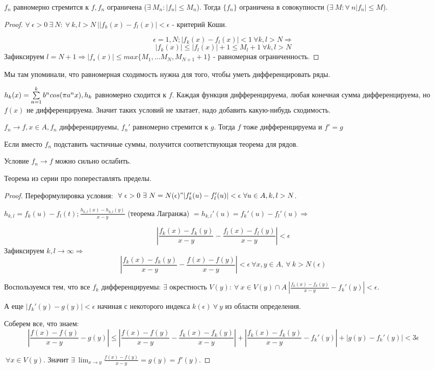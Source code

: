 \documentclass[12pt]{report}
\begin{document}
\begin{st}
$f_n$ равномерно стремится к $f, f_n$ ограничена ($\exists ~M_n: |f_n| \le M_n$). Тогда $\{f_n\}$ ограничена в совокупности ($\exists ~M: \forall ~n |f_n| \le M$).
\end{st}
\begin{proof}
$\forall ~\epsilon > 0 ~\exists ~N: ~\forall ~k, l > N ~||f_k(x) - f_l(x)| < \epsilon$ - критерий Коши.

$$\epsilon = 1, N; |f_k(x) - f_l(x)| < 1 ~\forall k, l > N \Rightarrow$$
$$|f_k(x)| \le |f_l(x)| + 1 \le M_l + 1 ~\forall k, l > N$$
Зафиксируем $l = N + 1 \Rightarrow |f_s(x)| \le max\{M_1, \dots M_N, M_{N + 1} + 1\}$ - равномерная ограниченность.
\end{proof}

Мы там упоминали, что равномерная сходимость нужна для того, чтобы уметь дифференцировать ряды.

$h_k(x) = \sum\limits_{n = 1}^k{b^n cos(\pi a^n x)}, h_k$ равномерно сходится к $f$. Каждая функция дифференцируема, любая конечная сумма дифференцируема, но $f(x)$ не дифференцируема. Значит таких условий не хватает, надо добавить какую-нибудь сходимость.

\begin{thm}
$f_n \to f, x \in A, f_n$ дифференцируемы, $f_n'$ равномерно стремится к $g$. Тогда $f$ тоже дифференцируема и $f' = g$

Если вместо $f_n$ подставить частичные суммы, получится соответствующая теорема для рядов.

Условие $f_n \to f$ можно сильно ослабить.

Теорема из серии про попереставлять пределы.
\end{thm}
\begin{proof}
Переформулировка условия: $~\forall ~\epsilon > 0 ~\exists ~N = N(\epsilon)" |f_k'(u) - f_l'(u)| < \epsilon ~\forall u \in A, k, l > N$.

$h_{k, l} = f_k(u) - f_l(t); \frac{h_{k, l}(x) - h_{k, l}(y)}{x - y}$ (теорема Лагранжа) $ = h_{k, l}'(u) = f_k'(u) - f_l'(u) \Rightarrow$

$$\left|\frac{f_k(x) - f_k(y)}{x - y} - \frac{f_l(x) - f_l(y)}{x - y}\right| < \epsilon$$
Зафиксируем $k, l \to \infty \Rightarrow$
$$\left|\frac{f_k(x) - f_k(y)}{x - y} - \frac{f(x) - f(y)}{x - y}\right| < \epsilon ~\forall x, y \in A, ~\forall ~k > N(\epsilon)$$

Воспользуемся тем, что все $f_k$ дифференцируемы: $\exists$ окрестность $V(y): ~\forall ~x \in V(y) \cap A ~\left|\frac{f_k(x) - f_k(y)}{x - y} - f_k'(y)\right| < \epsilon$.

А еще $|f_k'(y) - g(y)| < \epsilon$ начиная с некоторого индекса $k(\epsilon) ~\forall ~y$ из области определения.

Соберем все, что знаем:
$$\left|\frac{f(x) - f(y)}{x - y} - g(y)\right| \le \left|\frac{f(x) - f(y)}{x - y} - \frac{f_k(x) - f_k(y)}{x - y}\right| + \left|\frac{f_k(x) - f_k(y)}{x - y} - f_k'(y)\right| + |g(y) - f_k'(y)| < 3\epsilon$$ 

$~\forall x \in V(y)$. Значит $\exists ~\lim_{x \to y}{\frac{f(x) - f(y)}{x - y}} = g(y) = f'(y)$.
\end{proof}
\end{document}
